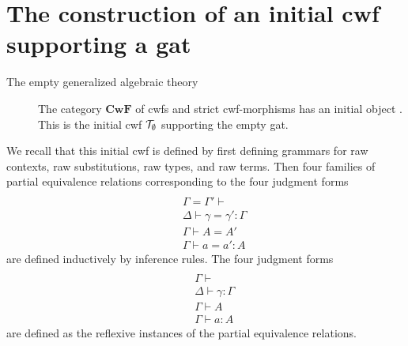 \documentclass{lmcs}
\newtheorem{theorem}{Theorem}
\def\Cwf{\mathbf{CwF}}
\begin{document}

\section{The construction of an initial cwf supporting a gat}

\begin{description}
\item[The empty generalized algebraic theory] 
The category $\Cwf$ of cwfs and strict cwf-morphisms has an initial object \cite{castellan}. This is the initial cwf ${\mathcal T}_\emptyset$ supporting the empty gat.
\end{description}

We recall that this initial cwf is defined by first defining grammars for raw contexts, raw substitutions, raw types, and raw terms. Then four families of partial equivalence relations corresponding to the four judgment forms
\begin{eqnarray*}
\\&&\Gamma = \Gamma' \vdash
\\&&\Delta \vdash \gamma = \gamma' : \Gamma
\\&&\Gamma \vdash A = A'
\\&&\Gamma \vdash a = a' : A
\end{eqnarray*}
are defined inductively by inference rules. The four judgment forms
\begin{eqnarray*}
\\&&\Gamma \vdash
\\&&\Delta \vdash \gamma : \Gamma
\\&&\Gamma \vdash A
\\&&\Gamma \vdash a : A
\end{eqnarray*}
are defined as the reflexive instances of the partial equivalence relations.
\end{document}

